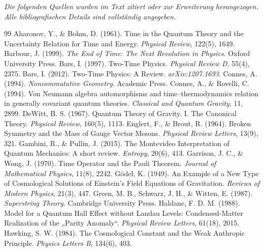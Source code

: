 \documentclass[11pt,a4paper]{article}
\begin{document}
\clearpage
{}
{}
\renewcommand{\refname}{Vollständige Bibliographie}
{\small\itshape Die folgenden Quellen wurden im Text zitiert oder zur Erweiterung herangezogen. Alle bibliografischen Details sind vollständig angegeben.\par}
\vspace{0.4em}
\begingroup
\small
\begin{thebibliography}{99}
\setlength{\itemsep}{0.25em}
Aharonov, Y., \& Bohm, D. (1961). Time in the Quantum Theory and the Uncertainty Relation for Time and Energy. \emph{Physical Review}, 122(5), 1649.
Barbour, J. (1999). \emph{The End of Time: The Next Revolution in Physics}. Oxford University Press.
Bars, I. (1997). Two-Time Physics. \emph{Physical Review D}, 55(4), 2375.
Bars, I. (2012). Two-Time Physics: A Review. \emph{arXiv:1207.1693}.
Connes, A. (1994). \emph{Noncommutative Geometry}. Academic Press.
Connes, A., \& Rovelli, C. (1994). Von Neumann algebra automorphisms and time--thermodynamics relation in generally covariant quantum theories. \emph{Classical and Quantum Gravity}, 11, 2899.
DeWitt, B. S. (1967). Quantum Theory of Gravity. I. The Canonical Theory. \emph{Physical Review}, 160(5), 1113.
Englert, F., \& Brout, R. (1964). Broken Symmetry and the Mass of Gauge Vector Mesons. \emph{Physical Review Letters}, 13(9), 321.
Gambini, R., \& Pullin, J. (2015). The Montevideo Interpretation of Quantum Mechanics: A short review. \emph{Entropy}, 20(6), 413.
Garrison, J. C., \& Wong, J. (1970). Time Operator and the Pauli Theorem. \emph{Journal of Mathematical Physics}, 11(8), 2242.
Gödel, K. (1949). An Example of a New Type of Cosmological Solutions of Einstein's Field Equations of Gravitation. \emph{Reviews of Modern Physics}, 21(3), 447.
Green, M. B., Schwarz, J. H., \& Witten, E. (1987). \emph{Superstring Theory}. Cambridge University Press.
Haldane, F. D. M. (1988). Model for a Quantum Hall Effect without Landau Levels: Condensed-Matter Realization of the „Parity Anomaly``. \emph{Physical Review Letters}, 61(18), 2015.
Hawking, S. W. (1984). The Cosmological Constant and the Weak Anthropic Principle. \emph{Physics Letters B}, 134(6), 403.

\end{thebibliography}
\end{document}
